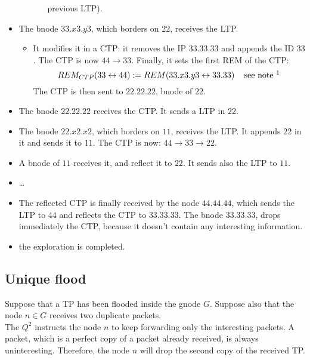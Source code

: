 \documentclass[a4paper]{article}
\begin{document}
\begin{itemize}
\begin{itemize}
\begin{itemize}
					previous LTP).
			\end{itemize}
	\end{itemize}
\item The bnode $33.x3.y3$, which borders on $22$, receives the LTP.
	\begin{itemize}
		\item It modifies it in a CTP: it removes the IP $33.33.33$
			and appends the ID $33$. The CTP is now $44\rightarrow
			33$. Finally, it sets the first REM of the CTP:
			\[ REM_{CTP}(33 \leftrightarrow 44):= REM(33.x3.y3
			\leftrightarrow 33.33)\;\;\;\textrm{ see note }
			\footnote{The node $33.x3.y3$
			knows that $33.33$ is a bnode of level 2 used to reach
			$44$ because it is written in the LTP. Moreover it
			knows a route to reach $33.33$, the level $2$ has been
			already explored. Thus $REM(33.x3.y3\leftrightarrow
			33.33)$ is a known measure.}\]
			The CTP is then sent to $22.22.22$, bnode of $22$.
	\end{itemize}
\item The bnode $22.22.22$ receives the CTP. It sends a LTP in $22$.
\item The bnode $22.x2.x2$, which borders on $11$, receives the LTP. It 
	appends $22$ in it and sends it to $11$. The CTP is now: $44
	\rightarrow 33\rightarrow 22$.
\item A bnode of $11$ receives it, and reflect it to $22$. It sends also the
	LTP to $11$.
\item \dots
\item The reflected CTP is finally received by the node $44.44.44$, which
	sends the LTP to $44$ and reflects the CTP to $33.33.33$. The bnode
	$33.33.33$, drops immediately the CTP, because it doesn't contain any
	interesting information.
\item the exploration is completed.
\end{itemize}


%
%

\subsection{Unique flood}
Suppose that a TP has been flooded inside the gnode $G$.
Suppose also that the node $n \in G$ receives two duplicate packets.\\
The $Q^2$ instructs the node $n$ to keep forwarding only the interesting packets.
A packet, which is a perfect copy of a packet already received, is always
uninteresting. Therefore, the node $n$ will drop the second copy of the
received TP. 
\end{document}
